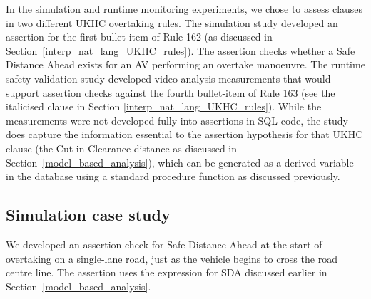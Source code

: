 

In the simulation and runtime monitoring experiments, we chose to assess clauses in two different UKHC overtaking rules. The simulation study developed an assertion for the first bullet-item of Rule 162 (as discussed in Section~\ref{interp_nat_lang_UKHC_rules}). 
The assertion checks whether a Safe Distance Ahead exists for an AV performing an overtake manoeuvre.
%
The runtime safety validation study developed video analysis measurements that would support assertion checks against the fourth bullet-item of Rule 163 
(see the italicised clause in Section \ref{interp_nat_lang_UKHC_rules}).
While the measurements were not developed fully into assertions in SQL code, the study does capture the information essential to the assertion hypothesis for that UKHC clause (the Cut-in Clearance distance as discussed in Section~\ref{model_based_analysis}), which can be generated as a derived variable in the database using a standard procedure function as discussed previously.

\subsection{Simulation case study}  \label{sim_case_study}
We developed an assertion check for Safe Distance Ahead at the start of overtaking on a single-lane road, just as the vehicle begins to cross the road centre line. The assertion uses the expression for SDA discussed earlier in Section~\ref{model_based_analysis}. 

